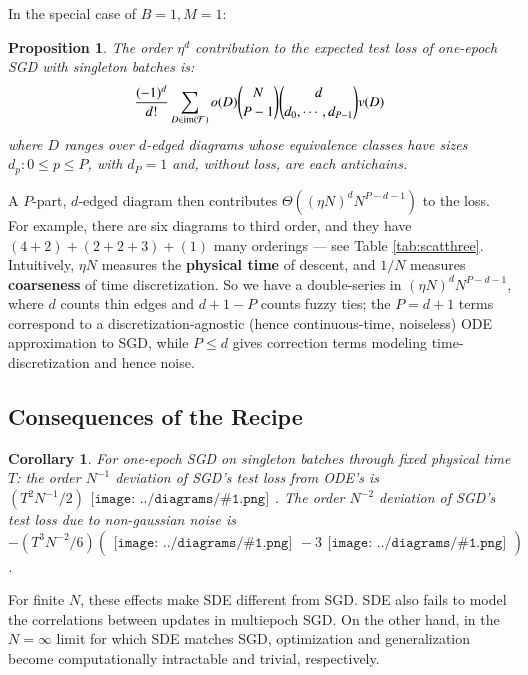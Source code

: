 \documentclass{article}
\newtheorem{cor}{Corollary}
\newtheorem{prop}{Proposition}
\newcommand{\Free}{\mathcal{F}}
\newcommand{\image}{\text{\textnormal{im}}}
\newcommand{\sdia}[1]{\begin{gathered}\texttt{[image: ../diagrams/\#1.png]}\end{gathered}}
\begin{document}
        In the special case of $B=1, M=1$:
        \begin{prop}\label{prop:vanilla}
            The order $\eta^d$ contribution to the expected test loss of one-epoch
            SGD with singleton batches is:
            \begin{equation}\label{eq:sgdbasiccoef}
                \frac{(-1)^d}{d!} \sum_{D\in \image(\Free)} 
                o(D) {N \choose P-1} {d \choose d_0,\cdots,d_{P-1}}
                v(D)
            \end{equation}
            where $D$ ranges over $d$-edged diagrams whose equivalence classes
            have sizes $d_p: 0\leq p\leq P$, with $d_P=1$
            and, without loss, are each antichains.
        \end{prop}
        A $P$-part, $d$-edged diagram then contributes $\Theta\left((\eta N)^d
        N^{P-d-1}\right)$ to the loss.  For example, there are six diagrams to
        third order, and they have $(4+2)+(2+2+3)+(1)$ many orderings --- see
        Table \ref{tab:scatthree}.  Intuitively, $\eta N$ measures the {\bf
        physical time} of descent, and $1/N$ measures {\bf coarseness} of time
        discretization.  So we have a double-series in $(\eta N)^d N^{P-d-1}$,
        where $d$ counts thin edges and $d+1-P$ counts fuzzy ties; the $P=d+1$
        terms correspond to a discretization-agnostic (hence continuous-time,
        noiseless) ODE approximation to SGD, while $P\leq d$ gives correction
        terms modeling time-discretization and hence noise.  


    \subsection{Consequences of the Recipe}

        \begin{cor}
            For one-epoch SGD on singleton batches through fixed physical time
            $T$: the order $N^{-1}$ deviation of SGD's test loss from ODE's is
            $
                ({{T^2 N^{-1}}/{2}}) \sdia{c(01-2)(02-12)}
            $.
            The order $N^{-2}$ deviation of SGD's test loss due to non-gaussian
            noise is
            $
                -({{T^3 N^{-2}}/{6}}) (\sdia{c(012-3)(03-13-23)} - 3 \sdia{c(01-2-3)(03-13-23)})
            $.
        \end{cor}
        For finite $N$, these effects make SDE different from SGD.  SDE also
        fails to model the correlations between updates in multiepoch SGD.  On
        the other hand, in the $N=\infty$ limit for which SDE matches SGD,
        optimization and generalization become computationally intractable and
        trivial, respectively. 
    
\end{document}
